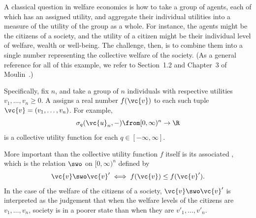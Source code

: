 \begin{example}
A classical question in welfare%
%
%
economics%
% 
% 
is how to take a group
of agents, each of which has an assigned utility,%
% 
% 
and aggregate their individual utilities into a measure of the utility of
the group as a whole.  For instance, the agents might be the citizens of a
society, and the utility of a citizen might be their individual level of
welfare, wealth or well-being.  The challenge, then, is to combine them
into a single number representing the collective welfare of the society.
(As a general reference for all of this example, we refer to Section~1.2
and Chapter~3 of Moulin~\cite{Moul}.)

Specifically, fix $n$, and take a group of $n$ individuals with respective
utilities $v_1, \ldots, v_n \geq 0$.  A  assigns a real number $f(\vc{v})$ to each such tuple
$\vc{v} = (v_1, \ldots, v_n)$.  
For example,
\[
\sigma_q(\vc{u}_n, -) \from [0, \infty)^n \to \R
\]
is a collective utility function for each $q \in [-\infty, \infty]$.  

More important than the collective utility function $f$ itself is its
associated , which is the relation $\swo$ on $[0, \infty)^n$ defined
  by
\[
\vc{v} \swo \vc{v}' \iff f(\vc{v}) \leq f(\vc{v}').
\]
In the case of the welfare of the citizens of a society, $\vc{v} \swo
\vc{v}'$ is interpreted as the judgement that when the welfare levels of
the citizens are $v_1, \ldots, v_n$, society is in a poorer state than when
they are $v'_1, \ldots, v'_n$.


\end{example}
